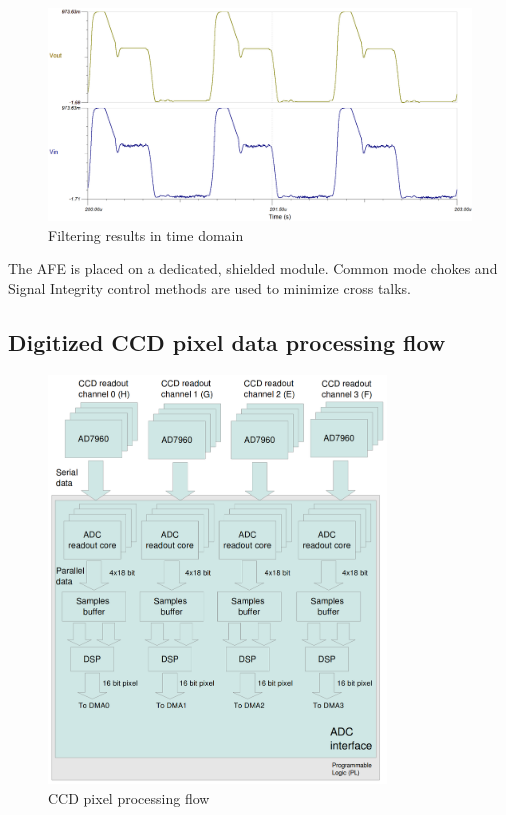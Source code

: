 \begin{figure}[H]
\centering
\includegraphics[width=\textwidth]{pict/bwswsim.png}
\caption{Filtering results in time domain}
\label{fig:bwswsim}
\end{figure}

The AFE is placed on a dedicated, shielded module. Common mode chokes and Signal Integrity control methods are used to minimize cross talks.


\subsection{Digitized CCD pixel data processing flow}

\begin{figure}[H]
\centering
\includegraphics[width=0.8\textwidth]{pict/pixel_proc.png}
\caption{CCD pixel processing flow}
\label{fig:pproc}
\end{figure}

